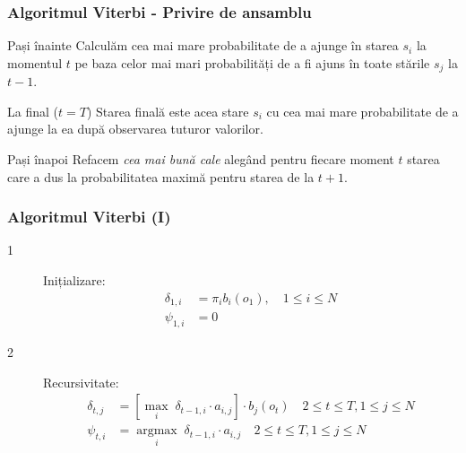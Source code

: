 \begin{frame}
  \frametitle{Algoritmul Viterbi - Privire de ansamblu}
  \begin{block}{Pași înainte}
    Calculăm cea mai mare probabilitate de a ajunge în starea $s_i$ 
    la momentul $t$ pe baza celor mai mari probabilități de a fi ajuns în 
    toate stările $s_j$ la $t-1$.
  \end{block}
  \pause
  \begin{block}{La final ($t=T$)}
    Starea finală este acea stare $s_i$ cu cea mai mare probabilitate de a ajunge
    la ea după observarea tuturor valorilor.
  \end{block}
  \pause
  \begin{block}{Pași înapoi}
    Refacem \emph{cea mai bună cale} alegând pentru fiecare moment $t$ starea care a
    dus la probabilitatea maximă pentru starea de la $t+1$.
  \end{block}
\end{frame}

\begin{frame}
  \frametitle{Algoritmul Viterbi (I)}
  \begin{description}
  \item[1] Inițializare: \\
    \begin{equation}
      \label{eq:viterbi-initialization}
      \begin{split}
        \delta_{1,i} & = \pi_{i}b_i(o_1), \quad 1 \le i \le N \\
        \psi_{1,i} & = 0
      \end{split}
    \end{equation}
  \item[2] Recursivitate: \\
    \begin{equation}
      \label{eq:viterbi-recursion}
      \begin{split}
        \delta_{t,j} & = [\underset{i }{\operatorname{max}}\; \delta_{t-1,i} \cdot
        a_{i,j}] \cdot b_{j}(o_{t})
        \quad \scriptstyle{2 \le t \le T, 1 \le j \le N} \\
        \psi_{t,i} & = \underset{i}{\operatorname{argmax}}\; \delta_{t-1,i}\cdot
        a_{i,j} \quad \scriptstyle{2 \le t \le T, 1 \le j \le N}
      \end{split}
    \end{equation}
  \end{description}
\end{frame}

